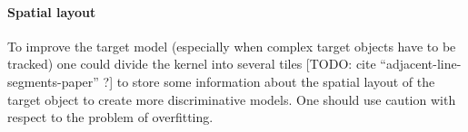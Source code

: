 \documentclass[11pt]{article}
\begin{document}
\paragraph{Spatial layout} To improve the target model (especially when complex
target objects have to be tracked) one could divide the kernel into several
tiles [TODO: cite ``adjacent-line-segments-paper'' ?] to store some information
about the spatial layout of the target object to create more discriminative
models. One should use caution with respect to the problem of overfitting.

\renewcommand\bibname{References}


\end{document}
